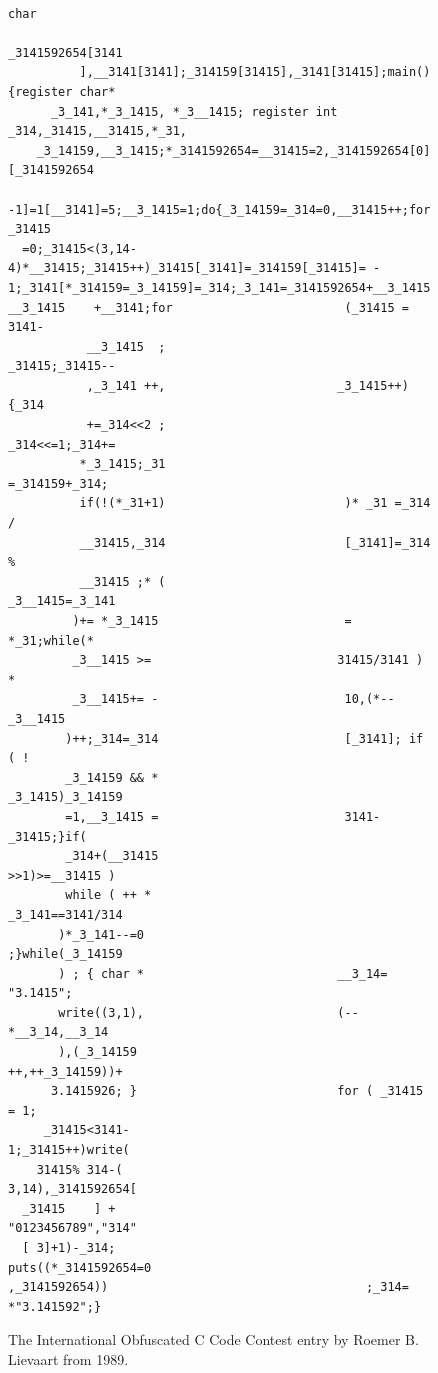 \begin{figure}
\centering
\vspace{-1em}
\begin{minipage}[t]{.5\textwidth}%
\begin{tiny}
\begin{verbatim}
                                                                        char
                                                            _3141592654[3141
          ],__3141[3141];_314159[31415],_3141[31415];main(){register char*
      _3_141,*_3_1415, *_3__1415; register int _314,_31415,__31415,*_31,
    _3_14159,__3_1415;*_3141592654=__31415=2,_3141592654[0][_3141592654
   -1]=1[__3141]=5;__3_1415=1;do{_3_14159=_314=0,__31415++;for( _31415
  =0;_31415<(3,14-4)*__31415;_31415++)_31415[_3141]=_314159[_31415]= -
1;_3141[*_314159=_3_14159]=_314;_3_141=_3141592654+__3_1415;_3_1415=
__3_1415    +__3141;for                        (_31415 = 3141-
           __3_1415  ;                        _31415;_31415--
           ,_3_141 ++,                        _3_1415++){_314
           +=_314<<2 ;                        _314<<=1;_314+=
          *_3_1415;_31                         =_314159+_314;
          if(!(*_31+1)                         )* _31 =_314 /
          __31415,_314                         [_3141]=_314 %
          __31415 ;* (                         _3__1415=_3_141
         )+= *_3_1415                          = *_31;while(*
         _3__1415 >=                          31415/3141 ) *
         _3__1415+= -                          10,(*--_3__1415
        )++;_314=_314                          [_3141]; if ( !
        _3_14159 && *                          _3_1415)_3_14159
        =1,__3_1415 =                          3141-_31415;}if(
        _314+(__31415                           >>1)>=__31415 )
        while ( ++ *                           _3_141==3141/314
       )*_3_141--=0                           ;}while(_3_14159
       ) ; { char *                           __3_14= "3.1415";
       write((3,1),                           (--*__3_14,__3_14
       ),(_3_14159                            ++,++_3_14159))+
      3.1415926; }                            for ( _31415 = 1;
     _31415<3141-                            1;_31415++)write(
    31415% 314-(                            3,14),_3141592654[
  _31415    ] +                                   "0123456789","314"
  [ 3]+1)-_314;                                   puts((*_3141592654=0
,_3141592654))                                    ;_314= *"3.141592";}
\end{verbatim}
\end{tiny}
\end{minipage}
\caption{The International Obfuscated C Code Contest entry by Roemer B. Lievaart from 1989.}
\label{fig:pi}
\end{figure}

